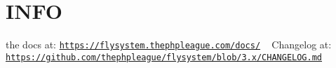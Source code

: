 \chapter{INFO }
\hypertarget{md__c_1_2xampp_2htdocs_2_g_pagos_ayuntamiento_2vendor_2league_2flysystem_2_i_n_f_o}{}\label{md__c_1_2xampp_2htdocs_2_g_pagos_ayuntamiento_2vendor_2league_2flysystem_2_i_n_f_o}
 the docs at\+: \href{https://flysystem.thephpleague.com/docs/}{\texttt{https\+://flysystem.\+thephpleague.\+com/docs/}} ~\newline
 Changelog at\+: \href{https://github.com/thephpleague/flysystem/blob/3.x/CHANGELOG.md}{\texttt{https\+://github.\+com/thephpleague/flysystem/blob/3.\+x/\+CHANGELOG.\+md}} 